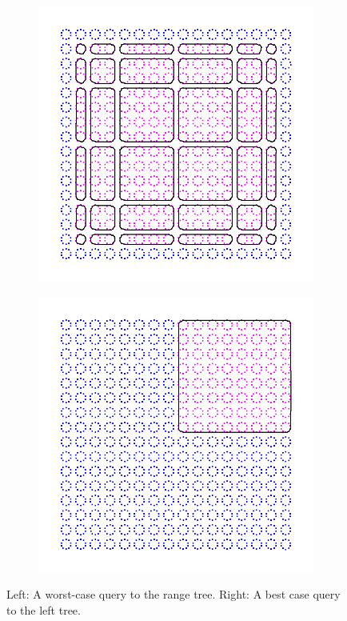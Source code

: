 \documentclass{article}
\begin{document}
\begin{figure}
    \centering
    \begin{subfigure}[b]{0.4\textwidth}
    \includegraphics[width=\textwidth]{images/hard_tree_query.png}
    \end{subfigure}
    \begin{subfigure}[b]{0.4\textwidth}
    \includegraphics[width=\textwidth]{images/ok_input_range_tree.png}
    \end{subfigure}
    \caption{Left: A worst-case query to the range tree. Right: A best case query to the left tree.}
    \label{fig:range_queries}
\end{figure}
\end{document}
